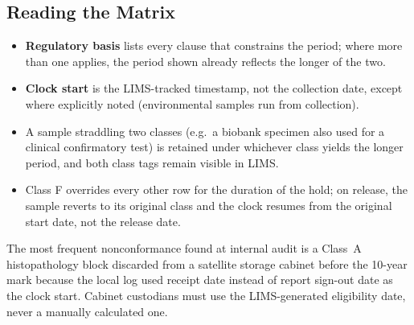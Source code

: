 \subsection{Reading the Matrix}
\begin{itemize}
  \item \textbf{Regulatory basis} lists every clause that constrains the period; where more
        than one applies, the period shown already reflects the longer of the two.
  \item \textbf{Clock start} is the LIMS-tracked timestamp, not the collection date, except
        where explicitly noted (environmental samples run from collection).
  \item A sample straddling two classes (e.g.\ a biobank specimen also used for a clinical
        confirmatory test) is retained under whichever class yields the longer period, and
        both class tags remain visible in LIMS.
  \item Class F overrides every other row for the duration of the hold; on release, the
        sample reverts to its original class and the clock resumes from the original start
        date, not the release date.
\end{itemize}

\begin{warnbox}
The most frequent nonconformance found at internal audit is a Class~A histopathology block
discarded from a satellite storage cabinet before the 10-year mark because the local log used
receipt date instead of report sign-out date as the clock start. Cabinet custodians must use
the LIMS-generated eligibility date, never a manually calculated one.
\end{warnbox}

